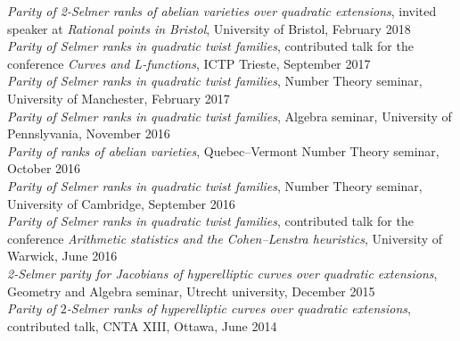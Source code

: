 \documentclass{res}
\begin{document}
\begin{resume}
{\it Parity of 2-Selmer ranks of abelian varieties over quadratic extensions}, invited speaker at {\it Rational points in Bristol}, University of Bristol, February 2018  \medskip \\
{\it Parity of Selmer ranks in quadratic twist families}, contributed talk for the conference {\it Curves and L-functions}, ICTP Trieste, September 2017  \medskip \\
{\it Parity of Selmer ranks in quadratic twist families}, Number Theory seminar, University of Manchester, February 2017  \medskip \\
{\it Parity of Selmer ranks in quadratic twist families}, Algebra seminar, University of Pennslyvania, November 2016  \medskip \\
{\it Parity of ranks of abelian varieties}, Quebec--Vermont Number Theory seminar, October 2016  \medskip \\
{\it Parity of Selmer ranks in quadratic twist families}, Number Theory seminar, University of Cambridge, September 2016  \medskip \\
{\it Parity of Selmer ranks in quadratic twist families}, contributed talk for the conference  {\it Arithmetic statistics and the Cohen--Lenstra heuristics}, University of Warwick, June 2016  \medskip \\
{\it 2-Selmer parity for Jacobians of hyperelliptic curves over quadratic extensions}, Geometry and Algebra seminar, Utrecht university, December 2015  \medskip \\
 {\it Parity of $2$-Selmer ranks of hyperelliptic curves over quadratic extensions}, contributed talk, CNTA XIII, Ottawa, June 2014  \medskip \\

\end{resume}
\end{document}
